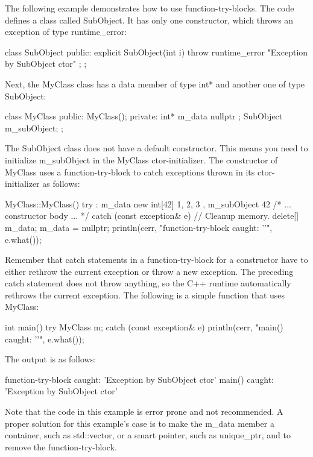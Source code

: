 The following example demonstrates how to use function-try-blocks. The code defines a class called SubObject. It has only one constructor, which throws an exception of type runtime\_error:

\begin{cpp}
class SubObject
{
    public:
        explicit SubObject(int i) {
            throw runtime_error { "Exception by SubObject ctor" }; }
};
\end{cpp}

Next, the MyClass class has a data member of type int* and another one of type SubObject:

\begin{cpp}
class MyClass
{
    public:
        MyClass();
    private:
        int* m_data { nullptr };
        SubObject m_subObject;
};
\end{cpp}

The SubObject class does not have a default constructor. This means you need to initialize m\_subObject in the MyClass ctor-initializer. The constructor of MyClass uses a function-try-block to catch exceptions thrown in its ctor-initializer as follows:

\begin{cpp}
MyClass::MyClass()
try
    : m_data { new int[42]{ 1, 2, 3 } }, m_subObject { 42 }
{
    /* ... constructor body ... */
}
catch (const exception& e)
{
    // Cleanup memory.
    delete[] m_data;
    m_data = nullptr;
    println(cerr, "function-try-block caught: '{}'", e.what());
}
\end{cpp}

Remember that catch statements in a function-try-block for a constructor have to either rethrow the current exception or throw a new exception. The preceding catch statement does not throw anything, so the C++ runtime automatically rethrows the current exception. The following is a simple function that uses MyClass:

\begin{cpp}
int main()
{
    try {
        MyClass m;
    } catch (const exception& e) {
        println(cerr, "main() caught: '{}'", e.what());
    }
}
\end{cpp}

The output is as follows:

\begin{shell}
function-try-block caught: 'Exception by SubObject ctor'
main() caught: 'Exception by SubObject ctor'
\end{shell}

Note that the code in this example is error prone and not recommended. A proper solution for this example’s case is to make the m\_data member a container, such as std::vector, or a smart pointer, such as unique\_ptr, and to remove the function-try-block.

